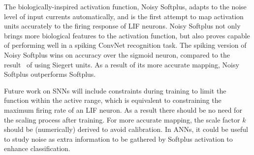 	The biologically-inspired activation function, Noisy Softplus, adapts to the noise level of input currents automatically, and is the first attempt to map activation units accurately to the firing response of LIF neurons.
	Noisy Softplus not only brings more biological features to the activation function, but also proves capable of performing well in a spiking ConvNet recognition task.
	The spiking version of Noisy Softplus wins on accuracy over the sigmoid neuron, compared to the result~\cite{Stromatias2015scalable} of using Siegert units.
	As a result of its more accurate mapping, Noisy Softplus outperforms Softplus.
	
	Future work on SNNs will include constraints during training to limit the function within the active range, which is equivalent to constraining the maximum firing rate of an LIF neuron.
	As a result there should be no need for the scaling process after training.
	For more accurate mapping, the scale factor $k$ should be (numerically) derived to avoid calibration.
	In ANNs, it could be useful to study noise as extra information to be gathered by Softplus activation to enhance classification.
